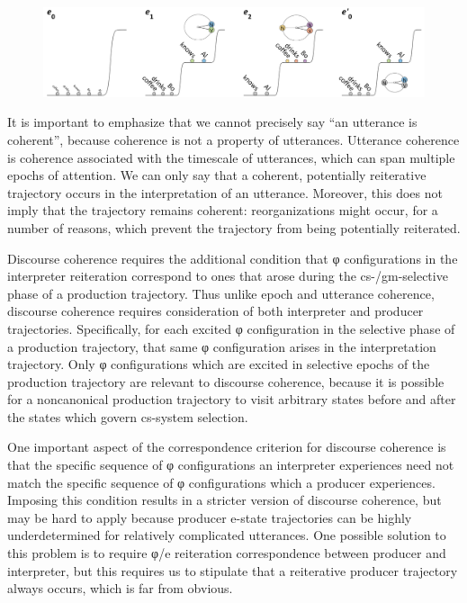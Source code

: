   
\begin{figure}
\includegraphics[width=\textwidth]{figures/Tilsen-img126.png}
\caption{\missingcaption}
\label{fig:}
\end{figure}
 

  It is important to emphasize that we cannot precisely say “an utterance is coherent”, because coherence is not a property of utterances. Utterance coherence is coherence associated with the timescale of utterances, which can span multiple epochs of attention. We can only say that a coherent, potentially reiterative trajectory occurs in the interpretation of an utterance. Moreover, this does not imply that the trajectory remains coherent: reorganizations might occur, for a number of reasons, which prevent the trajectory from being potentially reiterated.

  Discourse coherence requires the additional condition that φ configurations in the interpreter reiteration correspond to ones that arose during the cs-/gm-selective phase of a production trajectory. Thus unlike epoch and utterance coherence, discourse coherence requires consideration of both interpreter and producer trajectories. Specifically, for each excited φ configuration in the selective phase of a production trajectory, that same φ configuration arises in the interpretation trajectory. Only φ configurations which are excited in selective epochs of the production trajectory are relevant to discourse coherence, because it is possible for a noncanonical production trajectory to visit arbitrary states before and after the states which govern cs-system selection. 

  One important aspect of the correspondence criterion for discourse coherence is that the specific sequence of φ configurations an interpreter experiences need not match the specific sequence of φ configurations which a producer experiences. Imposing this condition results in a stricter version of discourse coherence, but may be hard to apply because producer e-state trajectories can be highly underdetermined for relatively complicated utterances. One possible solution to this problem is to require φ/e reiteration correspondence between producer and interpreter, but this requires us to stipulate that a reiterative producer trajectory always occurs, which is far from obvious.

